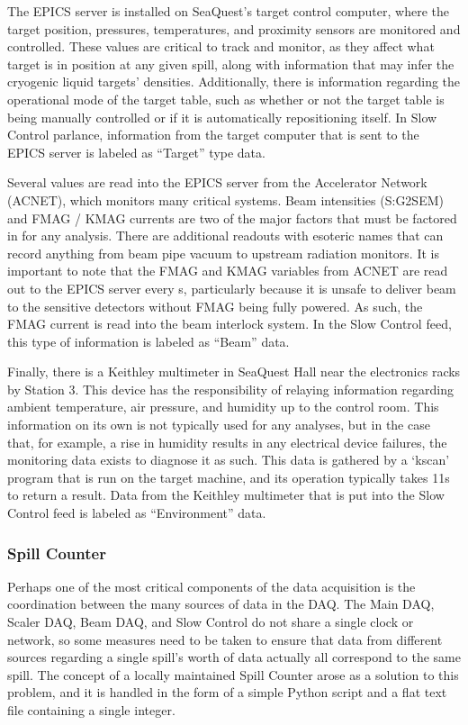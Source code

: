 The EPICS server is installed on SeaQuest's target control computer, where the target position, pressures, temperatures, and proximity sensors are monitored and controlled. These values are critical to track and monitor, as they affect what target is in position at any given spill, along with information that may infer the cryogenic liquid targets' densities. Additionally, there is information regarding the operational mode of the target table, such as whether or not the target table is being manually controlled or if it is automatically repositioning itself. In Slow Control parlance, information from the target computer that is sent to the EPICS server is labeled as ``Target'' type data.

Several values are read into the EPICS server from the Accelerator Network (ACNET), which monitors many critical systems. Beam intensities (S:G2SEM) and FMAG / KMAG currents are two of the major factors that must be factored in for any analysis. There are additional readouts with esoteric names that can record anything from beam pipe vacuum to upstream radiation monitors. It is important to note that the FMAG and KMAG variables from ACNET are read out to the EPICS server every \unit[3]{s}, particularly because it is unsafe to deliver beam to the sensitive detectors without FMAG being fully powered. As such, the FMAG current is read into the beam interlock system. In the Slow Control feed, this type of information is labeled as ``Beam'' data.

Finally, there is a Keithley multimeter \CN in SeaQuest Hall near the electronics racks by Station 3. This device has the responsibility of relaying information regarding ambient temperature, air pressure, and humidity up to the control room. This information on its own is not typically used for any analyses, but in the case that, for example, a rise in humidity results in any electrical device failures, the monitoring data exists to diagnose it as such. This data is gathered by a `kscan' program that is run on the target machine, and its operation typically takes 11s to return a result. Data from the Keithley multimeter that is put into the Slow Control feed is labeled as ``Environment'' data.

\subsubsection{Spill Counter}

Perhaps one of the most critical components of the data acquisition is the coordination between the many sources of data in the DAQ. The Main DAQ, Scaler DAQ, Beam DAQ, and Slow Control do not share a single clock or network, so some measures need to be taken to ensure that data from different sources regarding a single spill's worth of data actually all correspond to the same spill. The concept of a locally maintained Spill Counter arose as a solution to this problem, and it is handled in the form of a simple Python script and a flat text file containing a single integer.

